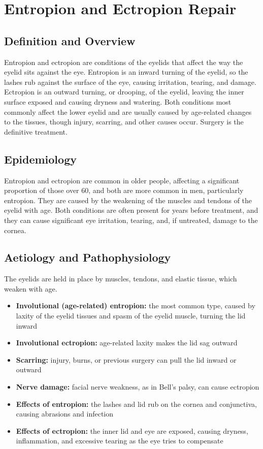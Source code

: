 \chapter{Entropion and Ectropion Repair}

\section*{Definition and Overview}
Entropion and ectropion are conditions of the eyelids that affect the way the eyelid sits against the eye. Entropion is an inward turning of the eyelid, so the lashes rub against the surface of the eye, causing irritation, tearing, and damage. Ectropion is an outward turning, or drooping, of the eyelid, leaving the inner surface exposed and causing dryness and watering. Both conditions most commonly affect the lower eyelid and are usually caused by age-related changes to the tissues, though injury, scarring, and other causes occur. Surgery is the definitive treatment.

\section*{Epidemiology}
Entropion and ectropion are common in older people, affecting a significant proportion of those over 60, and both are more common in men, particularly entropion. They are caused by the weakening of the muscles and tendons of the eyelid with age. Both conditions are often present for years before treatment, and they can cause significant eye irritation, tearing, and, if untreated, damage to the cornea.

\section*{Aetiology and Pathophysiology}
The eyelids are held in place by muscles, tendons, and elastic tissue, which weaken with age.
\begin{itemize}
    \item \textbf{Involutional (age-related) entropion:} the most common type, caused by laxity of the eyelid tissues and spasm of the eyelid muscle, turning the lid inward
    \item \textbf{Involutional ectropion:} age-related laxity makes the lid sag outward
    \item \textbf{Scarring:} injury, burns, or previous surgery can pull the lid inward or outward
    \item \textbf{Nerve damage:} facial nerve weakness, as in Bell's palsy, can cause ectropion
    \item \textbf{Effects of entropion:} the lashes and lid rub on the cornea and conjunctiva, causing abrasions and infection
    \item \textbf{Effects of ectropion:} the inner lid and eye are exposed, causing dryness, inflammation, and excessive tearing as the eye tries to compensate
\end{itemize}

